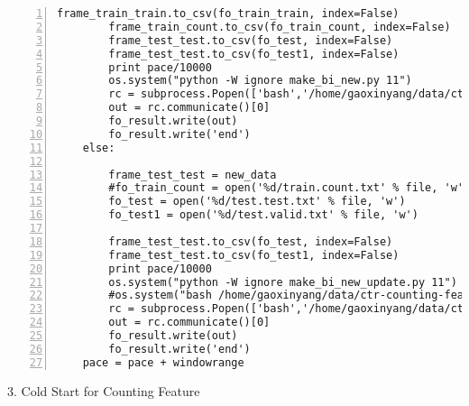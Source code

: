 \begin{lstlisting}[numbers=left, breaklines=true]
        frame_train_train.to_csv(fo_train_train, index=False)
        frame_train_count.to_csv(fo_train_count, index=False)
        frame_test_test.to_csv(fo_test, index=False)
        frame_test_test.to_csv(fo_test1, index=False)
        print pace/10000
        os.system("python -W ignore make_bi_new.py 11")
        rc = subprocess.Popen(['bash','/home/gaoxinyang/data/ctr-counting-features/models/lr/lr-driver.sh'],stdout=subprocess.PIPE)
        out = rc.communicate()[0]
        fo_result.write(out)
        fo_result.write('end')
    else:
    
        frame_test_test = new_data        
        #fo_train_count = open('%d/train.count.txt' % file, 'w')
        fo_test = open('%d/test.test.txt' % file, 'w')
        fo_test1 = open('%d/test.valid.txt' % file, 'w')

        frame_test_test.to_csv(fo_test, index=False)
        frame_test_test.to_csv(fo_test1, index=False)
        print pace/10000
        os.system("python -W ignore make_bi_new_update.py 11")
        #os.system("bash /home/gaoxinyang/data/ctr-counting-features/models/lr/lr-driver_update.sh")
        rc = subprocess.Popen(['bash','/home/gaoxinyang/data/ctr-counting-features/models/lr/lr-driver_update.sh'],stdout=subprocess.PIPE)
        out = rc.communicate()[0]
        fo_result.write(out)
        fo_result.write('end')
    pace = pace + windowrange
\end{lstlisting}
3. Cold Start for Counting Feature
